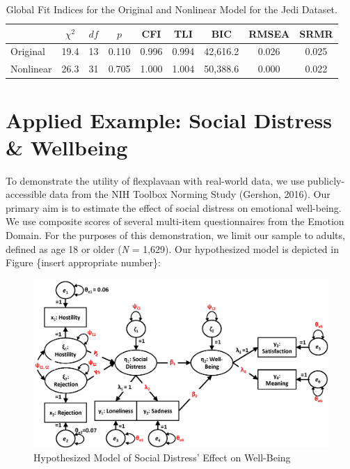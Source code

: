 \documentclass[
  english,
  doc]{apa6}
\begin{document}
\begin{table}[tbp]

\begin{center}
\begin{threeparttable}

\caption{\label{tab:tabresults}Global Fit Indices for the Original and Nonlinear Model for the Jedi Dataset.}

\begin{tabular}{lcccccccc}
\toprule
 & $\chi^2$ & $df$ & $p$ & CFI & TLI & BIC & RMSEA & SRMR\\
\midrule
Original & 19.4 & 13 & 0.110 & 0.996 & 0.994 & 42,616.2 & 0.026 & 0.025\\
Nonlinear & 26.3 & 31 & 0.705 & 1.000 & 1.004 & 50,388.6 & 0.000 & 0.022\\
\bottomrule
\end{tabular}

\end{threeparttable}
\end{center}

\end{table}

\hypertarget{applied-example-social-distress-wellbeing}{%
\section{Applied Example: Social Distress \& Wellbeing}\label{applied-example-social-distress-wellbeing}}

To demonstrate the utility of flexplavaan with real-world data, we use publicly-accessible data from the NIH Toolbox Norming Study (Gershon, 2016). Our primary aim is to estimate the effect of social distress on emotional well-being. We use composite scores of several multi-item questionnaires from the Emotion Domain. For the purposes of this demonstration, we limit our sample to adults, defined as age 18 or older (\emph{N} = 1,629). Our hypothesized model is depicted in Figure \{insert appropriate number\}:

\begin{figure}
\centering
\includegraphics{images/toolboxDiagramPrimary.png}
\caption{Hypothesized Model of Social Distress' Effect on Well-Being\label{fig:toolbox}}
\end{figure}
\end{document}
